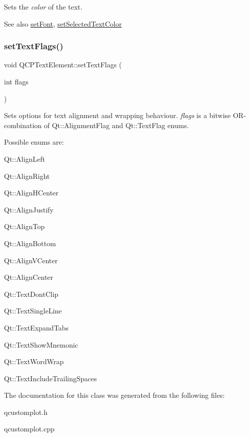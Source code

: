Sets the {\itshape color} of the text.

\begin{DoxySeeAlso}{See also}
\hyperlink{class_q_c_p_text_element_a09b3241769528fa87cb4bf35c97defad}{set\+Font}, \hyperlink{class_q_c_p_text_element_abaec200cae70a0eade53583defc0476d}{set\+Selected\+Text\+Color} 
\end{DoxySeeAlso}
\mbox{\label{class_q_c_p_text_element_ab908f437f552020888a3ad8cf8242605}} 
\subsubsection{\texorpdfstring{set\+Text\+Flags()}{setTextFlags()}}
{\footnotesize\ttfamily void Q\+C\+P\+Text\+Element\+::set\+Text\+Flags (\begin{DoxyParamCaption}\item[{int}]{flags }\end{DoxyParamCaption})}

Sets options for text alignment and wrapping behaviour. {\itshape flags} is a bitwise O\+R-\/combination of {\ttfamily Qt\+::\+Alignment\+Flag} and {\ttfamily Qt\+::\+Text\+Flag} enums.

Possible enums are\+:
\begin{DoxyItemize}
\item Qt\+::\+Align\+Left
\item Qt\+::\+Align\+Right
\item Qt\+::\+Align\+H\+Center
\item Qt\+::\+Align\+Justify
\item Qt\+::\+Align\+Top
\item Qt\+::\+Align\+Bottom
\item Qt\+::\+Align\+V\+Center
\item Qt\+::\+Align\+Center
\item Qt\+::\+Text\+Dont\+Clip
\item Qt\+::\+Text\+Single\+Line
\item Qt\+::\+Text\+Expand\+Tabs
\item Qt\+::\+Text\+Show\+Mnemonic
\item Qt\+::\+Text\+Word\+Wrap
\item Qt\+::\+Text\+Include\+Trailing\+Spaces 
\end{DoxyItemize}

The documentation for this class was generated from the following files\+:\begin{DoxyCompactItemize}
\item 
qcustomplot.\+h\item 
qcustomplot.\+cpp\end{DoxyCompactItemize}
